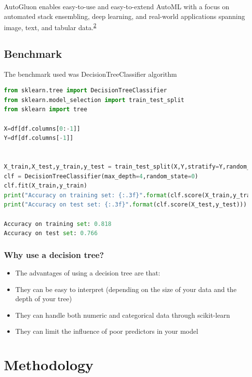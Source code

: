 \documentclass[
]{article}
\begin{document}
AutoGluon enables easy-to-use and easy-to-extend AutoML with a focus on
automated stack ensembling, deep learning, and real-world applications
spanning image, text, and tabular
data.\textsuperscript{\protect\hyperlink{ref-auto}{2}}

\hypertarget{benchmark}{%
\subsection{Benchmark}\label{benchmark}}

The benchmark used was DecisionTreeClassifier algorithm

\begin{lstlisting}[language=python]
from sklearn.tree import DecisionTreeClassifier
from sklearn.model_selection import train_test_split
from sklearn import tree

X=df[df.columns[0:-1]]
Y=df[df.columns[-1]]


X_train,X_test,y_train,y_test = train_test_split(X,Y,stratify=Y,random_state=42)
clf = DecisionTreeClassifier(max_depth=4,random_state=0)
clf.fit(X_train,y_train)
print("Accuracy on training set: {:.3f}".format(clf.score(X_train,y_train)))
print("Accuracy on test set: {:.3f}".format(clf.score(X_test,y_test)))

Accuracy on training set: 0.818
Accuracy on test set: 0.766

\end{lstlisting}

\hypertarget{why-use-a-decision-tree}{%
\subsubsection{Why use a decision tree?}\label{why-use-a-decision-tree}}

\begin{itemize}
\item
  The advantages of using a decision tree are that:
\item
  They can be easy to interpret (depending on the size of your data and
  the depth of your tree)
\item
  They can handle both numeric and categorical data through scikit-learn
\item
  They can limit the influence of poor predictors in your model
\end{itemize}

\hypertarget{methodology}{%
\section{Methodology}\label{methodology}}
\end{document}
